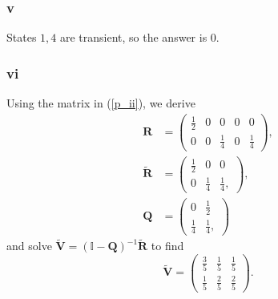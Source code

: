 \documentclass{article}
\begin{document}
\subsubsection{v}
States $1,4$ are transient, so the answer is $0$.

\subsubsection{vi}
Using the matrix in (\ref{p_ii}), we derive
\begin{align}
    \mathbf{R} &= \left(\begin{array}{cc|cc|c}
         \frac{1}{2} & 0 & 0 & 0 & 0  \\
         0 & 0 & \frac{1}{4} & 0 & \frac{1}{4} 
    \end{array}\right),\\
    \mathbf{\tilde{R}} &= \begin{pmatrix}
    \frac{1}{2} & 0 & 0 \\
    0 & \frac{1}{4} & \frac{1}{4},\end{pmatrix}, \\
    \mathbf{Q} &= \begin{pmatrix}
    0 & \frac{1}{2} \\
    \frac{1}{4} & \frac{1}{4},
    \end{pmatrix}
\end{align}
and solve $\mathbf{\tilde{V}} = (\mathbb{I}-\mathbf{Q})^{-1}\mathbf{\tilde{R}}$ to find
\begin{equation}
    \mathbf{\tilde{V}} = \begin{pmatrix}
    \frac{3}{5} & \frac{1}{5} & \frac{1}{5} \\
    \frac{1}{5} & \frac{2}{5} & \frac{2}{5}
    \end{pmatrix}.
\end{equation}
\end{document}
